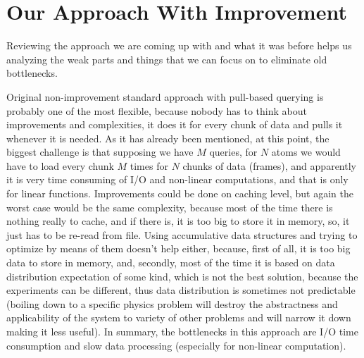 \documentclass[12pt,letterpaper]{report}
\begin{document}
\section{Our Approach With Improvement}

\hspace{3em} Reviewing the approach we are coming up with and what it was before helps us analyzing the weak parts and things that we can focus on to eliminate old bottlenecks.

\noindent\hspace{3em}Original non-improvement standard approach with pull-based querying is probably one of the most flexible, because nobody has to think about improvements and complexities, it does it for every chunk of data and pulls it whenever it is needed. As it has already been mentioned, at this point, the biggest challenge is that supposing we have $M$ queries, for $N$ atoms we would have to load every chunk $M$ times for $N$ chunks of data (frames), and apparently it is very time consuming of I/O and non-linear computations, and that is only for linear functions. Improvements could be done on caching level, but again the worst case would be the same complexity, because most of the time there is nothing really to cache, and if there is, it is too big to store it in memory, so, it just has to be re-read from file. Using accumulative data structures and trying to optimize by means of them doesn't help either, because, first of all, it is too big data to store in memory, and, secondly, most of the time it is based on data distribution expectation of some kind, which is not the best solution, because the experiments can be different, thus data distribution is sometimes not predictable (boiling down to a specific physics problem will destroy the abstractness and applicability of the system to variety of other problems and will narrow it down making it less useful). In summary, the bottlenecks in this approach are I/O time consumption and slow data processing (especially for non-linear computation).
\end{document}
